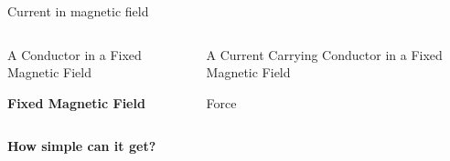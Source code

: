 \documentclass[compress]{beamer}
\begin{document}
\begin{frame}{Current in magnetic field}

\begin{columns}
    \begin{column}{0.5\linewidth}
    A Conductor in a Fixed Magnetic Field

    \textbf{Fixed Magnetic Field}

    \end{column}
    \begin{column}{0.5\linewidth}


    A Current Carrying Conductor in a Fixed Magnetic Field

    Force

    \end{column}
\end{columns}


\end{frame}

\begin{frame}[plain]

    \begin{center}
        \bf How simple can it get?
    \end{center}

\end{frame}
\end{document}
